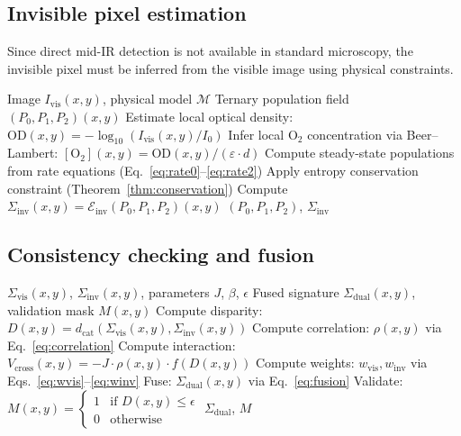 \documentclass[11pt,twocolumn,a4paper]{article}
\newcommand{\Sigvis}{\Sigma_{\mathrm{vis}}}
\newcommand{\Siginv}{\Sigma_{\mathrm{inv}}}
\newcommand{\dcat}{d_{\mathrm{cat}}}
\begin{document}
\subsection{Invisible pixel estimation}

Since direct mid-IR detection is not available in standard microscopy, the invisible pixel must be inferred from the visible image using physical constraints.

\begin{algorithm}[H]
\caption{Invisible Pixel Estimation}\label{alg:invisible}
\begin{algorithmic}[1]
\REQUIRE Image $I_{\mathrm{vis}}(x,y)$, physical model $\mathcal{M}$
\ENSURE Ternary population field $(P_0, P_1, P_2)(x,y)$
    \STATE Estimate local optical density: $\mathrm{OD}(x,y) = -\log_{10}(I_{\mathrm{vis}}(x,y)/I_0)$
    \STATE Infer local O$_2$ concentration via Beer--Lambert: $[\mathrm{O}_2](x,y) = \mathrm{OD}(x,y) / (\varepsilon \cdot d)$
    \STATE Compute steady-state populations from rate equations (Eq.~\ref{eq:rate0}--\ref{eq:rate2})
    \STATE Apply entropy conservation constraint (Theorem~\ref{thm:conservation})
\ENDFOR
\STATE Compute $\Siginv(x,y) = \mathcal{E}_{\mathrm{inv}}(P_0, P_1, P_2)(x,y)$
\RETURN $(P_0, P_1, P_2)$, $\Siginv$
\end{algorithmic}
\end{algorithm}

\subsection{Consistency checking and fusion}

\begin{algorithm}[H]
\caption{Stereogram Fusion}\label{alg:fusion}
\begin{algorithmic}[1]
\REQUIRE $\Sigvis(x,y)$, $\Siginv(x,y)$, parameters $J$, $\beta$, $\epsilon$
\ENSURE Fused signature $\Sigma_{\mathrm{dual}}(x,y)$, validation mask $M(x,y)$
    \STATE Compute disparity: $D(x,y) = \dcat(\Sigvis(x,y), \Siginv(x,y))$
    \STATE Compute correlation: $\rho(x,y)$ via Eq.~\ref{eq:correlation}
    \STATE Compute interaction: $V_{\mathrm{cross}}(x,y) = -J \cdot \rho(x,y) \cdot f(D(x,y))$
    \STATE Compute weights: $w_{\mathrm{vis}}, w_{\mathrm{inv}}$ via Eqs.~\ref{eq:wvis}--\ref{eq:winv}
    \STATE Fuse: $\Sigma_{\mathrm{dual}}(x,y)$ via Eq.~\ref{eq:fusion}
    \STATE Validate: $M(x,y) = \begin{cases} 1 & \text{if } D(x,y) \leq \epsilon \\ 0 & \text{otherwise} \end{cases}$
\ENDFOR
\RETURN $\Sigma_{\mathrm{dual}}$, $M$
\end{algorithmic}
\end{algorithm}
\end{document}

